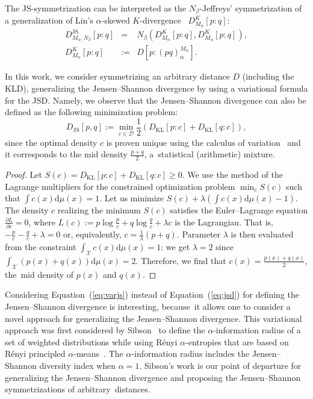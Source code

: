 \documentclass[entropy,article,accept,oneauthor,pdftex,entropy]{Definitions/mdpi}
\def\JS{\mathrm{JS}}
\def\KL{\mathrm{KL}}
\def\dmu{\mathrm{d}\mu}
\def\calD{\mathcal{D}}
\def\calX{\mathcal{X}}
\def\dmu{\mathrm{d}\mu}
\begin{document}
The JS-symmetrization can be interpreted as the $N_\beta$-Jeffreys' symmetrization of a generalization of 
Lin's $\alpha$-skewed $K$-divergence~\cite{JS-1991} $D_{M_\alpha}^K[p:q]$:
\begin{eqnarray}
D_{M_\alpha,N_\beta}^\JS[p:q] &=& N_\beta(D_{M_\alpha}^K[p:q],D_{M_\alpha}^K[p:q]),\\
D_{M_\alpha}^K[p:q] &:=& D\left[p:(pq)_\alpha^{M_\alpha}\right].
\end{eqnarray}

In this work, we consider symmetrizing an arbitrary distance $D$ (including the KLD), generalizing the Jensen--Shannon divergence by using a
 variational formula for the JSD. 
Namely, we observe that the Jensen--Shannon divergence can also be defined as the following minimization problem:
\begin{equation}\label{eq:varjs}
D_\JS[p,q] := \min_{c\in\calD} \frac{1}{2}\left( D_\KL[p:c]+D_\KL[q:c] \right),
\end{equation}
since the optimal density $c$ is proven unique using the calculus of variation~\cite{Sibson-1969,Amari-2007,IG-2014} and it corresponds to the mid density $\frac{p+q}{2}$, a~statistical (arithmetic) mixture.

\begin{proof}
Let $S(c)=D_\KL[p:c]+D_\KL[q:c]\geq 0$.
We use the method of the Lagrange multipliers for the constrained optimization problem $\min_c S(c)$ such that $\int c(x)\dmu(x)=1$.
Let us minimize $S(c)+\lambda\left(\int c(x)\dmu(x)-1\right)$.
The density $c$ realizing the minimum $S(c)$ satisfies the Euler--Lagrange equation $\frac{\partial L}{\partial c}=0$, where $L(c):=p\log\frac{p}{c}+q\log\frac{q}{c}+\lambda c$ is the Lagrangian.
That is, $-\frac{p}{c}-\frac{q}{c}+\lambda=0$ or, equivalently, $c=\frac{1}{\lambda}(p+q)$.
Parameter $\lambda$ is then evaluated from the constraint $\int_\calX c(x)\dmu(x)=1$:
we get $\lambda=2$ since $\int_\calX (p(x)+q(x))\dmu(x)=2$.
Therefore, we find that $c(x)=\frac{p(x)+q(x)}{2}$, the~mid density of $p(x)$ and $q(x)$.
\end{proof}

Considering Equation~(\ref{eq:varjs}) instead of Equation~(\ref{eq:jsd}) for defining the Jensen--Shannon divergence is interesting, because~it allows one to consider a novel approach for generalizing the Jensen--Shannon divergence.
This variational approach was first considered by Sibson~\cite{Sibson-1969} to define the $\alpha$-information radius of a set of weighted distributions while using R\'enyi $\alpha$-entropies that are based on R\'enyi principled $\alpha$-means~\cite{Renyi-1961}.
The $\alpha$-information radius  includes the Jensen--Shannon diversity index when $\alpha=1$.
Sibson's work is our point of departure for generalizing the Jensen--Shannon divergence and proposing the Jensen--Shannon symmetrizations of arbitrary~distances.
\end{document}
